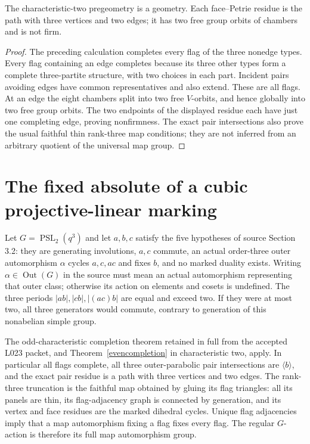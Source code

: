 \documentclass[11pt,a4paper]{article}
\newcommand{\gen}[1]{\langle #1\rangle}
\newcommand{\PSL}{\operatorname{PSL}}
\begin{document}
\begin{theorem}\label{evencompletion}
The characteristic-two pregeometry is a geometry. Each face--Petrie
residue is the path with three vertices and two edges; it has two free
group orbits of chambers and is not firm.
\end{theorem}
\begin{proof}
The preceding calculation completes every flag of the three nonedge types.
Every flag containing an edge completes because its three other types
form a complete three-partite structure, with two choices in each part.
Incident pairs avoiding edges have common representatives and also extend.
These are all flags. At an edge the eight chambers split into two free
$V$-orbits, and hence globally into two free group orbits. The two endpoints
of the displayed residue each have just one completing edge, proving
nonfirmness. The exact pair intersections also prove the usual faithful
thin rank-three map conditions; they are not inferred from an arbitrary
quotient of the universal map group.
\end{proof}

\section{The fixed absolute of a cubic projective-linear marking}
Let $G=\PSL_2(q^3)$ and let $a,b,c$ satisfy the five hypotheses of source
Section 3.2: they are generating involutions, $a,c$ commute, an actual
order-three outer automorphism $\alpha$ cycles $a,c,ac$ and fixes $b$,
and no marked duality exists. Writing $\alpha\in\operatorname{Out}(G)$
in the source must mean an actual automorphism representing that outer
class; otherwise its action on elements and cosets is undefined.
The three periods $|ab|,|cb|,|(ac)b|$ are equal and exceed two.
If they were at most two, all three generators would commute, contrary
to generation of this nonabelian simple group.

The odd-characteristic completion theorem retained in full from the
accepted L023 packet, and Theorem~\ref{evencompletion} in characteristic
two, apply. In particular all flags complete, all three outer-parabolic
pair intersections are $\gen b$, and the exact pair residue is a path
with three vertices and two edges. The rank-three truncation is the faithful
map obtained by gluing its flag triangles: all its panels are thin, its
flag-adjacency graph is connected by generation, and its vertex and face
residues are the marked dihedral cycles. Unique flag adjacencies imply that
a map automorphism fixing a flag fixes every flag. The regular $G$-action
is therefore its full map automorphism group.
\end{document}

